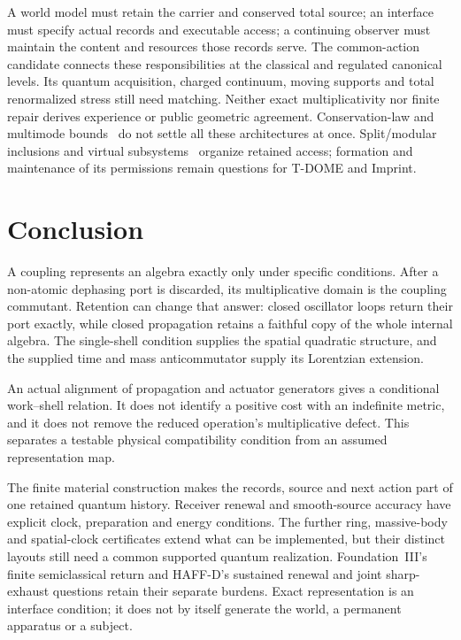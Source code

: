 A world model must retain the carrier and conserved total source; an interface must specify actual records and executable access; a continuing observer must maintain the content and resources those records serve. The common-action candidate connects these responsibilities at the classical and regulated canonical levels. Its quantum acquisition, charged continuum, moving supports and total renormalized stress still need matching. Neither exact multiplicativity nor finite repair derives experience or public geometric agreement. Conservation-law and multimode bounds~\cite{Ozawa2002,Shapiro2006,GeaBanacloche2010} do not settle all these architectures at once. Split/modular inclusions and virtual subsystems~\cite{DoplicherLongo1984,Wiesbrock1993,Zanardi2001} organize retained access; formation and maintenance of its permissions remain questions for T-DOME and Imprint.

\section{Conclusion}
\label{sec:conclusion}

A coupling represents an algebra exactly only under specific conditions.
After a non-atomic dephasing port is discarded, its multiplicative
domain is the coupling commutant. Retention can change that answer:
closed oscillator loops return their port exactly, while closed
propagation retains a faithful copy of the whole internal algebra.
The single-shell condition supplies the spatial quadratic structure,
and the supplied time and mass anticommutator supply its Lorentzian
extension.

An actual alignment of propagation and actuator generators gives a
conditional work--shell relation. It does not identify a positive
cost with an indefinite metric, and it does not remove the reduced
operation's multiplicative defect. This separates a testable
physical compatibility condition from an assumed representation map.

The finite material construction makes the records, source and next
action part of one retained quantum history. Receiver renewal and
smooth-source accuracy have explicit clock, preparation and energy
conditions. The further ring, massive-body and spatial-clock
certificates extend what can be implemented, but their distinct
layouts still need a common supported quantum realization.
Foundation~III's finite semiclassical return and HAFF-D's sustained
renewal and joint sharp-exhaust questions retain their separate
burdens. Exact representation is an interface condition; it does
not by itself generate the world, a permanent apparatus or a subject.

